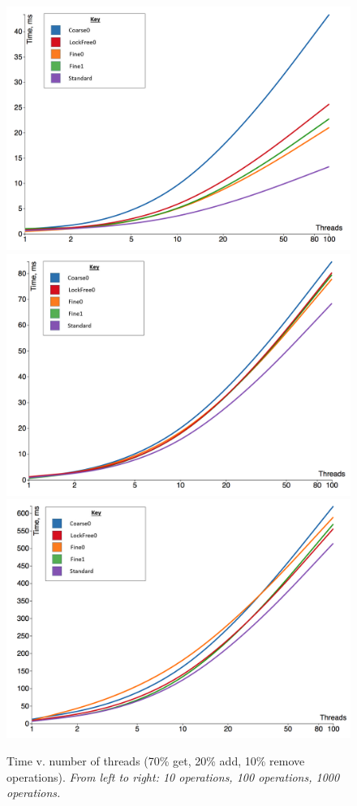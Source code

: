 \documentclass[12pt,oneline,a4paper]{ouparticle}
\begin{document}
\begin{figure}
    \centering
    \hspace*{-2.25cm}
    \includegraphics[width=0.37\linewidth]{4}\hspace{0em}
    \includegraphics[width=0.37\linewidth]{5}\hspace{0em}
    \includegraphics[width=0.37\linewidth]{6}
    \hspace*{-2.25cm}
    \centering
    \caption{Time v. number of threads (70\% get, 20\% add, 10\% remove operations).\newline{}
    {\it From left to right: 10 operations, 100 operations, 1000 operations.}}
    \label{fig:g2}
\end{figure}
\end{document}
